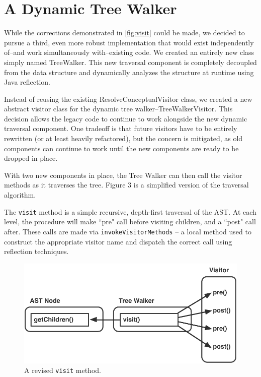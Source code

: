 \documentclass[times]{speauth}
\begin{document}
\section{A Dynamic Tree Walker}
While the corrections demonstrated in \ref{fig:visit} could be made, we decided to pursue a third, even more robust implementation that would exist independently of--and work simultaneously with--existing code. We created an entirely new class simply named TreeWalker. This new traversal component is completely decoupled from the data structure and dynamically analyzes the structure at runtime using Java reflection.

Instead of reusing the existing ResolveConceptualVisitor class, we created a new abstract visitor class for the dynamic tree walker--TreeWalkerVisitor. This decision allows the legacy code to continue to work alongside the new dynamic traversal component. One tradeoff is that future visitors have to be entirely rewritten (or at least heavily refactored), but the concern is mitigated, as old components can continue to work until the new components are ready to be dropped in place.

With two new components in place, the Tree Walker can then call the visitor methods as it traverses the tree. Figure 3 is a simplified version of the traversal algorithm.

The \texttt{visit} method is a simple recursive, depth-first traversal of the AST. At each level, the procedure will make ``pre" call before visiting children, and a ``post" call after. These calls are made via \texttt{invokeVisitorMethods} -- a local method used to construct the appropriate visitor name and dispatch the correct call using reflection techniques.

\begin{figure}[!htb]
\centering
\includegraphics[scale=.60]{figures/prepostprepost.pdf}
\caption{A revised \texttt{visit} method.}
\end{figure}
\end{document}
